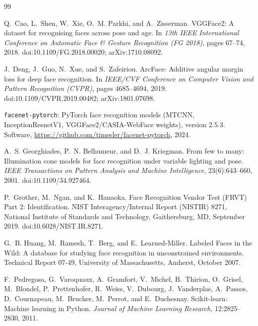 \begin{thebibliography}{99}
\footnotesize
\setlength{\itemsep}{0pt plus 0.2pt}
\setlength{\parsep}{0pt}
\setlength{\bibsep}{-1.5pt}

Q.~Cao, L.~Shen, W.~Xie, O.~M. Parkhi, and A.~Zisserman.
\newblock VGGFace2: A dataset for recognising faces across pose and age.
\newblock In \emph{13th IEEE International Conference on Automatic Face \& Gesture Recognition (FG 2018)}, pages 67--74, 2018.
\newblock doi:10.1109/FG.2018.00020; arXiv:1710.08092.

J.~Deng, J.~Guo, N.~Xue, and S.~Zafeiriou.
\newblock ArcFace: Additive angular margin loss for deep face recognition.
\newblock In \emph{IEEE/CVF Conference on Computer Vision and Pattern Recognition (CVPR)}, pages 4685--4694, 2019.
\newblock doi:10.1109/CVPR.2019.00482; arXiv:1801.07698.

\texttt{facenet-pytorch}: PyTorch face recognition models (MTCNN, InceptionResnetV1, VGGFace2/CASIA-WebFace weights), version 2.5.3.
\newblock Software, \url{https://github.com/timesler/facenet-pytorch}, 2024.

A.~S. Georghiades, P.~N. Belhumeur, and D.~J. Kriegman.
\newblock From few to many: Illumination cone models for face recognition under variable lighting and pose.
\newblock \emph{IEEE Transactions on Pattern Analysis and Machine Intelligence}, 23(6):643--660, 2001.
\newblock doi:10.1109/34.927464.

P.~Grother, M.~Ngan, and K.~Hanaoka.
\newblock Face Recognition Vendor Test (FRVT) Part 2: Identification.
\newblock NIST Interagency/Internal Report (NISTIR) 8271, National Institute of Standards and Technology, Gaithersburg, MD, September 2019.
\newblock doi:10.6028/NIST.IR.8271.

G.~B. Huang, M.~Ramesh, T.~Berg, and E.~Learned-Miller.
\newblock Labeled Faces in the Wild: A database for studying face recognition in unconstrained environments.
\newblock Technical Report 07-49, University of Massachusetts, Amherst, October 2007.

F.~Pedregosa, G.~Varoquaux, A.~Gramfort, V.~Michel, B.~Thirion, O.~Grisel, M.~Blondel, P.~Prettenhofer, R.~Weiss, V.~Dubourg, J.~Vanderplas, A.~Passos, D.~Cournapeau, M.~Brucher, M.~Perrot, and E.~Duchesnay.
\newblock Scikit-learn: Machine learning in Python.
\newblock \emph{Journal of Machine Learning Research}, 12:2825--2830, 2011.


\end{thebibliography}
